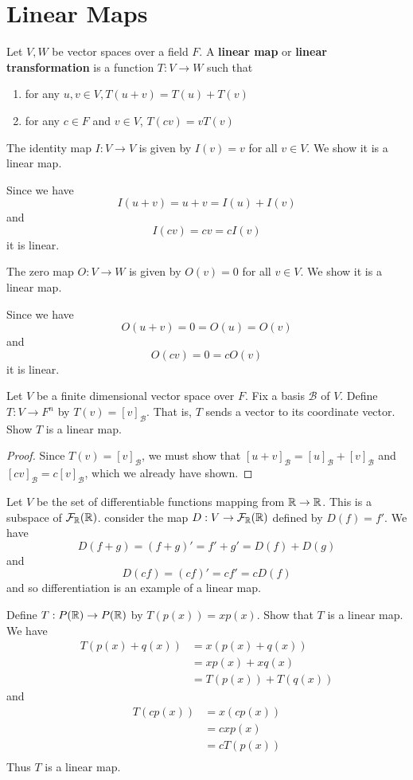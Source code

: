 \documentclass{article}
\begin{document}
\section{Linear Maps}
\begin{definition}
  Let $V, W$ be vector spaces over a field $F$. A \textbf{linear map} or \textbf{linear transformation} is a function $T: V \to W$ such that
  \begin{enumerate}
    \item for any $u, v \in V, T(u+v) = T(u) + T(v)$
    \item for any $c \in F$ and $v \in V$, $T(cv) = vT(v)$
  \end{enumerate}
\end{definition}
\begin{example}
  The identity map $I: V \to V$ is given by $I(v) = v$ for all $v \in V$.
  We show it is a linear map.

  Since we have \[
    I(u+v) = u + v = I(u) + I(v)
  \]
  and \[
    I(cv) = cv = cI(v)
  \]
  it is linear.
\end{example}
\begin{example}
  The zero map $O: V \to W$ is given by $O(v) = 0$ for all $v \in V$.
  We show it is a linear map.

  Since we have \[
    O(u+v) = 0 = O(u) = O(v)
  \]
  and \[
    O(cv) = 0 = cO(v)
  \]
  it is linear.
\end{example}
\begin{proposition}
  Let $V$ be a finite dimensional vector space over $F$. Fix a basis $\mathcal{B}$ of $V$. Define $T: V \to F^n$ by $T(v) = [v]_\mathcal{B}$. That is, $T$ sends a vector to its coordinate vector. Show $T$ is a linear map.
\end{proposition}
\begin{proof}
  Since $T(v) = [v]_\mathcal{B}$, we must show that $[u + v]_\mathcal{B} = [u]_\mathcal{B} + [v]_\mathcal{B}$ and $[cv]_\mathcal{B} = c[v]_\mathcal{B}$, which we already have shown.
\end{proof}
\begin{example}
  Let $V$ be the set of differentiable functions mapping from $\mathbb{R} \to \mathbb{R}$. This is a subspace of $\mathcal{F}_{\mathbb{R}}(\mathbb{R})$. consider the map $D: V \to \mathcal{F}_{\mathbb{R}}(\mathbb{R})$ defined by $D(f) = f'$. We have \[
    D(f+g) = (f+g)' = f' + g' = D(f) + D(g)
  \] and \[
    D(cf) = (cf)' = cf' = cD(f)
  \]
  and so differentiation is an example of a linear map.
\end{example}
\begin{example}
  Define $T: P(\mathbb{R}) \to P(\mathbb{R})$ by $T(p(x)) = xp(x)$. Show that $T$ is a linear map.
  We have
  \begin{align*}
    T(p(x) + q(x)) &= x(p(x) + q(x))\\
    &= xp(x) + xq(x)\\
    &= T(p(x)) + T(q(x))
  \end{align*}
  and
  \begin{align*}
    T(cp(x)) &= x(cp(x))\\
    &= cxp(x)\\
    &= cT(p(x))\\
  \end{align*}
  Thus $T$ is a linear map.
\end{example}
\end{document}
